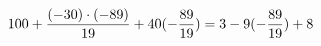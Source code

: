 \documentclass[preview]{standalone}
\begin{document}
\begin{align*}
\special{dvisvgm:raw <g id='unique000'>}100 + \frac{(-30) \cdot (-89)}{19} + 40 (- \frac{89}{19}) = 3 - 9 (- \frac{89}{19}) + 8\special{dvisvgm:raw </g>}
\end{align*}
\end{document}
